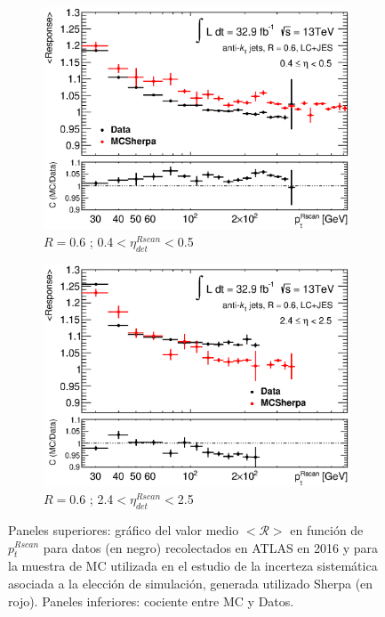 \begin{figure}[ht]
\begin{subfigure}[b]{0.495\textwidth}
        \centering
        \includegraphics[width=\textwidth]{images/ResponseRatio6LC_49_Sherpa}
        \caption{$R=$0.6 ; 0.4$<\eta^{Rscan}_{det}<$0.5}
    \end{subfigure}
    \hfill
    \begin{subfigure}[b]{0.495\textwidth}
        \centering
        \includegraphics[width=\textwidth]{images/ResponseRatio6LC_69_Sherpa}
        \caption{$R=$0.6 ; 2.4$<\eta^{Rscan}_{det}<$2.5}
    \end{subfigure}
    \caption{ Paneles superiores: gráfico del valor medio $<\mathcal{R}>$ en función de $p_t^{Rscan}$ para datos (en negro) recolectados en ATLAS en 2016 y para la muestra de MC utilizada en el estudio de la incerteza sistemática asociada a la elección de simulación, generada utilizado Sherpa (en rojo). Paneles inferiores: cociente entre MC y Datos.} 
    \label{fig:ResponseSherpa}
\end{figure}

